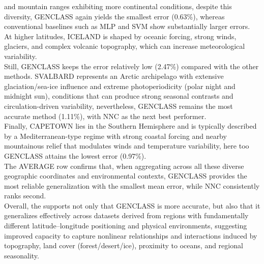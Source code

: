 \documentclass[12pt]{Definitions/academia}
\begin{document}
and mountain ranges exhibiting more continental conditions, despite
this diversity, GENCLASS again yields the smallest error (0.63\%),
whereas conventional baselines such as MLP and SVM show substantially
larger errors.\\
 At higher latitudes, ICELAND
is shaped by oceanic
forcing, strong winds, glaciers, and complex volcanic topography,
which can increase meteorological variability.\\
 Still, GENCLASS keeps
the error relatively low (2.47\%) compared with the other methods.
SVALBARD 
represents an Arctic archipelago with extensive glaciation/sea-ice
influence and extreme photoperiodicity (polar night and midnight sun),
conditions that can produce strong seasonal contrasts and circulation-driven
variability, nevertheless, GENCLASS remains the most accurate method
(1.11\%), with NNC as the next best performer.\\
 Finally, CAPETOWN 
lies in the Southern Hemisphere and is typically described
by a Mediterranean-type regime with strong coastal forcing and nearby
mountainous relief that modulates winds and temperature variability,
here too GENCLASS attains the lowest error (0.97\%).\\
 The AVERAGE row
confirms that, when aggregating across all these diverse geographic
coordinates and environmental contexts, GENCLASS provides the most
reliable generalization with the smallest mean error, while NNC consistently
ranks second.\\
 Overall, the 
supports not only that GENCLASS is more accurate, but also that it
generalizes effectively across datasets derived from regions with
fundamentally different latitude--longitude positioning and physical
environments, suggesting improved capacity to capture nonlinear relationships
and interactions induced by topography, land cover (forest/desert/ice),
proximity to oceans, and regional seasonality.
\end{document}
